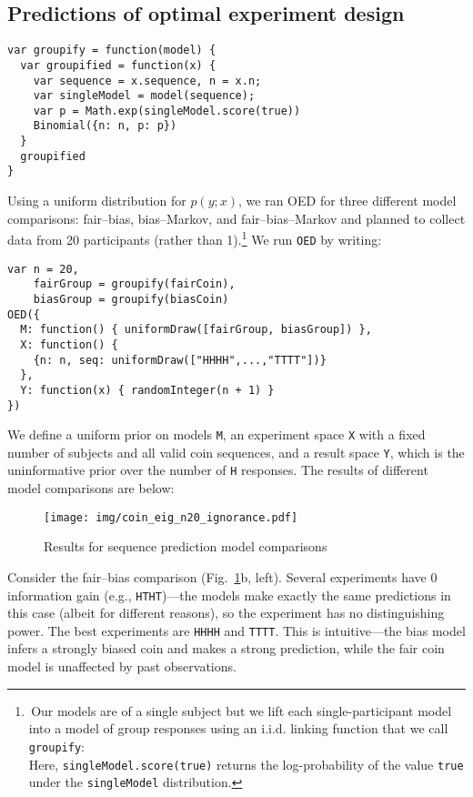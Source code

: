 \documentclass[10pt,letterpaper]{article}
\begin{document}
\subsection{Predictions of optimal experiment design}

\newsavebox{\LstBox}

\begin{lrbox}{\LstBox}
\begin{lstlisting}
var groupify = function(model) {
  var groupified = function(x) {
    var sequence = x.sequence, n = x.n;
    var singleModel = model(sequence);
    var p = Math.exp(singleModel.score(true))
    Binomial({n: n, p: p})
  }
  groupified
}
\end{lstlisting}
\end{lrbox}

Using a uniform distribution for $p(y; x)$, we ran OED for three different model comparisons: fair--bias, bias--Markov, and fair--bias--Markov and planned to collect data from 20 participants (rather than 1).\footnote{\,Our models are of a single subject but we lift each single-participant model into a model of group responses using an i.i.d. linking function that we call \texttt{groupify}:
\usebox{\LstBox}\\
Here, \texttt{singleModel.score(true)} returns the log-probability of the value \texttt{true} under the \texttt{singleModel} distribution.}
We run \texttt{OED} by writing:
\begin{lstlisting}
var n = 20,
    fairGroup = groupify(fairCoin),
    biasGroup = groupify(biasCoin)
OED({
  M: function() { uniformDraw([fairGroup, biasGroup]) },
  X: function() {
    {n: n, seq: uniformDraw(["HHHH",...,"TTTT"])}
  },
  Y: function(x) { randomInteger(n + 1) }
})
\end{lstlisting}
We define a uniform prior on models \texttt{M}, an experiment space \texttt{X} with a fixed number of subjects and all valid coin sequences, and a result space \texttt{Y}, which is the uninformative prior over the number of \texttt{H} responses.
The results of different model comparisons are below:

\begin{figure}[h]
 \texttt{[image: img/coin\_eig\_n20\_ignorance.pdf]}
  \caption{Results for sequence prediction model comparisons}
  \label{fig:run-coin}
\end{figure}

Consider the fair--bias comparison (Fig.~\ref{fig:run-coin}b, left).
Several experiments have 0 information gain (e.g., \lstinline{HTHT})---the models make exactly the same predictions in this case (albeit for different reasons), so the experiment has no distinguishing power.
The best experiments are \lstinline{HHHH} and \lstinline{TTTT}.
This is intuitive---the bias model infers a strongly biased coin and makes a strong prediction, while the fair coin model is unaffected by past observations.
\end{document}
